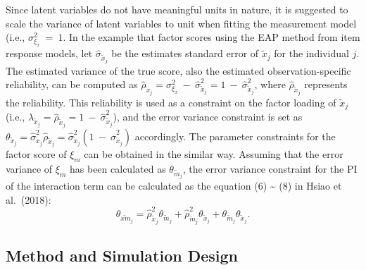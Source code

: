 \documentclass[
  man]{apa6}
\begin{document}
Since latent variables do not have meaningful units in nature, it is suggested to scale the variance of latent variables to unit when fitting the measurement model (i.e., \(\sigma_{\xi_{x}}^2 \ = \ 1\). In the example that factor scores using the EAP method from item response models, let \(\hat{\sigma}_{\tilde{x}_{j}}\) be the estimates standard error of \(\tilde{x}_{j}\) for the individual \(j\). The estimated variance of the true score, also the estimated observation-specific reliability, can be computed as \(\hat{\rho}_{\tilde{x}_{j}} = \sigma_{\xi_{x}}^2 \ - \ \hat{\sigma}_{\tilde{x}_{j}}^2 = 1 \ - \ \hat{\sigma}_{\tilde{x}_{j}}^2\), where \(\hat{\rho}_{\tilde{x}_{j}}\) represents the reliability. This reliability is used as a constraint on the factor loading of \(\tilde{x}_{j}\) (i.e., \(\lambda_{\tilde{x}_{j}} = \hat{\rho}_{\tilde{x}_{j}} = 1 \ - \ \hat{\sigma}_{\tilde{x}_{j}}^2\)), and the error variance constraint is set as \(\theta_{\tilde{x}_{j}} = \hat{\sigma}_{\tilde{x}_{j}}^2\hat{\rho}_{\tilde{x}_{j}} = \hat{\sigma}_{\tilde{x}_{j}}^2(1 \ - \ \hat{\sigma}_{\tilde{x}_{j}}^2)\) accordingly. The parameter constraints for the factor score of \(\xi_{m}\) can be obtained in the similar way. Assuming that the error variance of \(\xi_{m}\) has been calculated as \(\theta_{\tilde{m}_{j}}\), the error variance constraint for the PI of the interaction term can be calculated as the equation (6) \textasciitilde{} (8) in Hsiao et al.~(2018):
\begin{equation}
\theta_{\widetilde{xm}_{j}} =  \hat{\rho}_{\tilde{x}_{j}}^2\theta_{\tilde{m}_{j}} +
                        \hat{\rho}_{\tilde{m}_{j}}^2\theta_{\tilde{x}_{j}} +
                        \theta_{\tilde{m}_{j}}\theta_{\tilde{x}_{j}}. 
\end{equation}

\hypertarget{method-and-simulation-design}{%
\subsection{Method and Simulation Design}\label{method-and-simulation-design}}
\end{document}
